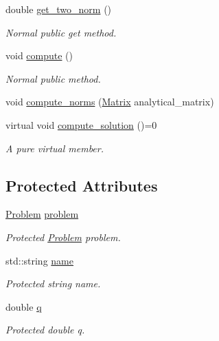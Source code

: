 \begin{DoxyCompactItemize}
double \hyperlink{classMethod_aa44aa54b2296d6bee9f0ed22f73991ba}{get\+\_\+two\+\_\+norm} ()
\begin{DoxyCompactList}\small\item\em Normal public get method. \end{DoxyCompactList}\item 
void \hyperlink{classMethod_a50aea9f4e6101bf7c37f145177b72693}{compute} ()
\begin{DoxyCompactList}\small\item\em Normal public method. \end{DoxyCompactList}\item 
void \hyperlink{classMethod_a4f1d13311599c8ffd73835663beb0e7b}{compute\+\_\+norms} (\hyperlink{classMatrix}{Matrix} analytical\+\_\+matrix)
\item 
virtual void \hyperlink{classMethod_af3dcec8e066214e82d8b4578a4a55076}{compute\+\_\+solution} ()=0
\begin{DoxyCompactList}\small\item\em A pure virtual member. \end{DoxyCompactList}\end{DoxyCompactItemize}
\subsection*{Protected Attributes}
\begin{DoxyCompactItemize}
\item 
\hyperlink{classProblem}{Problem} \hyperlink{classMethod_a29a08a679b5d30a8c813766308205041}{problem}
\begin{DoxyCompactList}\small\item\em Protected \hyperlink{classProblem}{Problem} problem. \end{DoxyCompactList}\item 
std\+::string \hyperlink{classMethod_a8648aeee4e6ebb1adc52522ac26ac523}{name}
\begin{DoxyCompactList}\small\item\em Protected string name. \end{DoxyCompactList}\item 
double \hyperlink{classMethod_a794257d62bedf3691c3c0a2b921b8886}{q}
\begin{DoxyCompactList}\small\item\em Protected double q. \end{DoxyCompactList}\end{DoxyCompactItemize}
